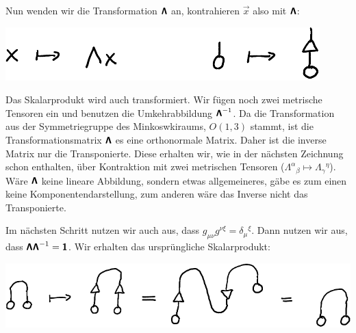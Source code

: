 Nun wenden wir die Transformation $\boldsymbol{\mathsf{\Lambda}}$ an, kontrahieren $\vec x$
also mit $\boldsymbol{\mathsf{\Lambda}}$:
\begin{center}
	\includegraphics{H1-Transformation.pdf}
\end{center}

Das Skalarprodukt wird auch transformiert. Wir fügen noch zwei metrische
Tensoren ein und benutzen die Umkehrabbildung $\boldsymbol{\mathsf{\Lambda}}^{-1}$. Da die
Transformation aus der Symmetriegruppe des Minkoswkiraums, $O(1, 3)$ stammt,
ist die Transformationsmatrix $\boldsymbol{\mathsf{\Lambda}}$ es eine orthonormale Matrix.
Daher ist die inverse Matrix nur die Transponierte. Diese erhalten wir, wie in
der nächsten Zeichnung schon enthalten, über Kontraktion mit zwei metrischen
Tensoren ($\Lambda^\alpha{}_\beta \mapsto \Lambda_\gamma{}^\eta$). Wäre $\boldsymbol{\mathsf{\Lambda}}$ keine lineare Abbildung, sondern etwas allgemeineres, gäbe es zum
einen keine Komponentendarstellung, zum anderen wäre das Inverse nicht das
Transponierte.

Im nächsten
Schritt nutzen wir auch aus, dass $g_{\mu\nu} g^{\nu\xi} = \delta_\mu{}^\xi$.
Dann nutzen wir aus, dass $\boldsymbol{\mathsf{\Lambda}} \boldsymbol{\mathsf{\Lambda}}^{-1} = \boldsymbol{\mathsf{1}}$. Wir
erhalten das ursprüngliche Skalarprodukt:
\begin{center}
	\includegraphics{H1-Invarianz.pdf}
\end{center}

